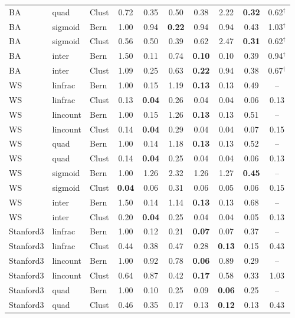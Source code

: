 \documentclass{article}
\begin{document}
\begin{table}[h]
\begin{tabular}{lllccccccc}
BA & quad & Clust & 0.72 & 0.35 & 0.50 & 0.38 & 2.22 & \textbf{0.32} & 0.62$^\dagger$ \\
BA & sigmoid & Bern & 1.00 & 0.94 & \textbf{0.22} & 0.94 & 0.94 & 0.43 & 1.03$^\dagger$ \\
BA & sigmoid & Clust & 0.56 & 0.50 & 0.39 & 0.62 & 2.47 & \textbf{0.31} & 0.62$^\dagger$ \\
BA & inter & Bern & 1.50 & 0.11 & 0.74 & \textbf{0.10} & 0.10 & 0.39 & 0.94$^\dagger$ \\
BA & inter & Clust & 1.09 & 0.25 & 0.63 & \textbf{0.22} & 0.94 & 0.38 & 0.67$^\dagger$ \\
WS & linfrac & Bern & 1.00 & 0.15 & 1.19 & \textbf{0.13} & 0.13 & 0.49 & -- \\
WS & linfrac & Clust & 0.13 & \textbf{0.04} & 0.26 & 0.04 & 0.04 & 0.06 & 0.13 \\
WS & lincount & Bern & 1.00 & 0.15 & 1.26 & \textbf{0.13} & 0.13 & 0.51 & -- \\
WS & lincount & Clust & 0.14 & \textbf{0.04} & 0.29 & 0.04 & 0.04 & 0.07 & 0.15 \\
WS & quad & Bern & 1.00 & 0.14 & 1.18 & \textbf{0.13} & 0.13 & 0.52 & -- \\
WS & quad & Clust & 0.14 & \textbf{0.04} & 0.25 & 0.04 & 0.04 & 0.06 & 0.13 \\
WS & sigmoid & Bern & 1.00 & 1.26 & 2.32 & 1.26 & 1.27 & \textbf{0.45} & -- \\
WS & sigmoid & Clust & \textbf{0.04} & 0.06 & 0.31 & 0.06 & 0.05 & 0.06 & 0.15 \\
WS & inter & Bern & 1.50 & 0.14 & 1.14 & \textbf{0.13} & 0.13 & 0.68 & -- \\
WS & inter & Clust & 0.20 & \textbf{0.04} & 0.25 & 0.04 & 0.04 & 0.05 & 0.13 \\
Stanford3 & linfrac & Bern & 1.00 & 0.12 & 0.21 & \textbf{0.07} & 0.07 & 0.37 & -- \\
Stanford3 & linfrac & Clust & 0.44 & 0.38 & 0.47 & 0.28 & \textbf{0.13} & 0.15 & 0.43 \\
Stanford3 & lincount & Bern & 1.00 & 0.92 & 0.78 & \textbf{0.06} & 0.89 & 0.29 & -- \\
Stanford3 & lincount & Clust & 0.64 & 0.87 & 0.42 & \textbf{0.17} & 0.58 & 0.33 & 1.03 \\
Stanford3 & quad & Bern & 1.00 & 0.10 & 0.25 & 0.09 & \textbf{0.06} & 0.25 & -- \\
Stanford3 & quad & Clust & 0.46 & 0.35 & 0.17 & 0.13 & \textbf{0.12} & 0.13 & 0.43 \\

\end{tabular}
\end{table}
\end{document}

